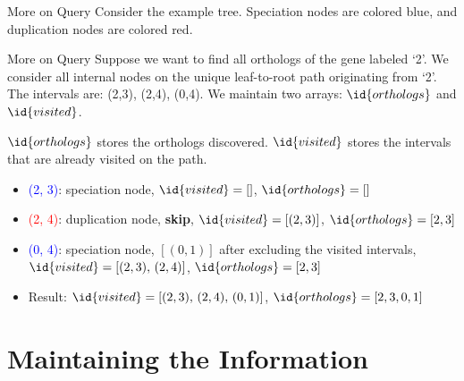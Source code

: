 \documentclass{beamer}
\begin{document}
\begin{frame}{More on Query}
    Consider the example tree. Speciation nodes are colored {\color{blue}blue}, and duplication nodes are colored {\color{red}red}.

\end{frame}

\begin{frame}{More on Query}
    Suppose we want to find all orthologs of the gene labeled `2'. We consider all internal nodes on the unique leaf-to-root path originating from `2'. The intervals are: (2,3), (2,4), (0,4). We maintain two arrays: $\id{orthologs}$ and $\id{visited}$.

    $\id{orthologs}$ stores the orthologs discovered. $\id{visited}$ stores the intervals that are already visited on the path.

    \begin{itemize}
        \item \textcolor{blue}{(2, 3)}: speciation node, $\id{visited} = []$, $\id{orthologs} = []$
        \item \textcolor{red}{(2, 4)}: duplication node, \textbf{skip}, $\id{visited} = [(2,3)]$, $\id{orthologs} = [2,3]$
        \item \textcolor{blue}{(0, 4)}: speciation node, $[(0,1)]$ after excluding the visited intervals, $\id{visited} = [(2,3),\, (2,4)]$, $\id{orthologs} = [2,3]$
        \item Result: $\id{visited} = [(2,3),\,(2,4),\,(0,1)]$, $\id{orthologs} = [2,3,0,1]$
    \end{itemize}
\end{frame}

\section{Maintaining the Information}
\end{document}
